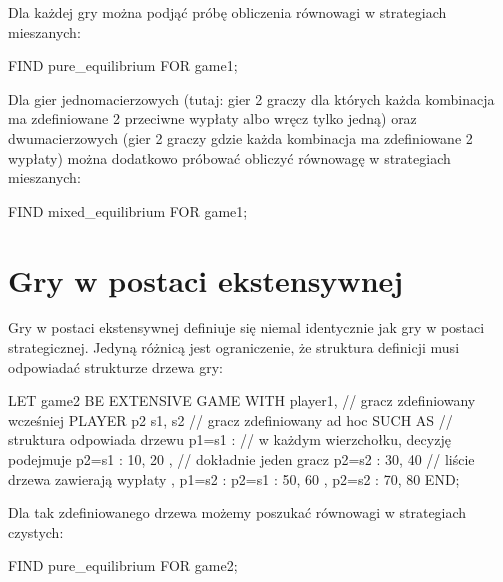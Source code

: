 \documentclass{standalone}
\begin{document}
Dla każdej gry można podjąć próbę obliczenia równowagi w strategiach mieszanych:

\begin{code}
FIND pure_equilibrium FOR game1;
\end{code}

Dla gier jednomacierzowych (tutaj: gier 2 graczy dla których każda kombinacja ma zdefiniowane 2 przeciwne wypłaty albo wręcz tylko jedną) oraz
dwumacierzowych (gier 2 graczy gdzie każda kombinacja ma zdefiniowane 2 wypłaty) można dodatkowo próbować obliczyć równowagę w strategiach mieszanych:

\begin{code}
FIND mixed_equilibrium FOR game1;
\end{code}

\section{Gry w postaci ekstensywnej}

Gry w postaci ekstensywnej definiuje się niemal identycznie jak gry w postaci strategicznej. Jedyną różnicą jest ograniczenie, że struktura definicji musi odpowiadać strukturze drzewa gry:

\begin{code}
LET game2 BE
  EXTENSIVE GAME
  WITH
    player1, // gracz zdefiniowany wcześniej
    PLAYER p2 { s1, s2 } // gracz zdefiniowany ad hoc
  SUCH AS                 // struktura odpowiada drzewu
    { p1=s1 :             // w każdym wierzchołku, decyzję podejmuje
      { p2=s1 : 10, 20 }, // dokładnie jeden gracz
      { p2=s2 : 30, 40 }  // liście drzewa zawierają wypłaty
    },
    { p1=s2 :
      { p2=s1 : 50, 60 },
      { p2=s2 : 70, 80 }
    }
  END;
\end{code}

Dla tak zdefiniowanego drzewa możemy poszukać równowagi w strategiach czystych:

\begin{code}
FIND pure_equilibrium FOR game2;
\end{code}
\end{document}
